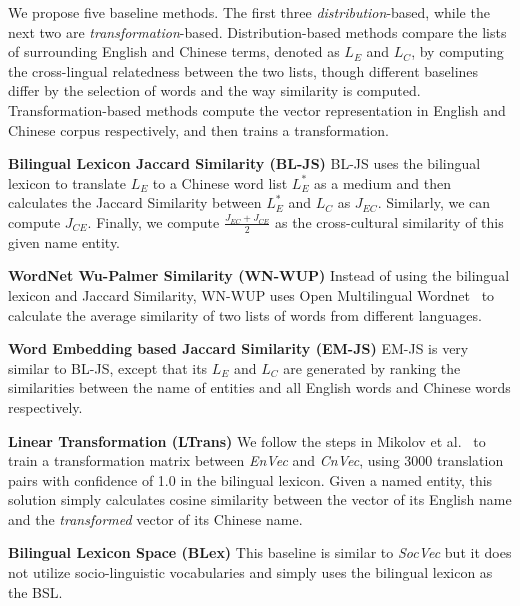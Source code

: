 We propose five baseline methods. The first three
\emph{distribution}-based, while the next two 
are \emph{transformation}-based. 
Distribution-based methods compare the lists of surrounding
English and Chinese terms, denoted as $L_E$ and $L_C$, 
by computing the cross-lingual relatedness between the two lists, 
though different baselines differ by the
selection of words and the way similarity is computed.
Transformation-based methods compute the vector representation 
in English and Chinese corpus respectively, and
then trains a transformation.

\textbf{Bilingual Lexicon Jaccard Similarity (BL-JS)}
BL-JS uses the bilingual lexicon to translate $L_E$  to a Chinese word list 
$L_E^*$ as a medium and then calculates the Jaccard Similarity between 
$L_E^*$ and $L_C$ as $J_{EC}$. Similarly, we can compute $J_{CE}$. 
Finally, we compute $\frac{J_{EC}+J_{CE}}{2}$ as the cross-cultural similarity 
of this given name entity.
 
	\textbf {WordNet Wu-Palmer Similarity (WN-WUP)} Instead of using 
the bilingual lexicon and Jaccard Similarity, WN-WUP uses Open Multilingual 
Wordnet~\cite{wang2013building,bond2013linking} to calculate the average 
similarity of two lists of words from different languages.
	
	\textbf {Word Embedding based Jaccard Similarity (EM-JS)} EM-JS is 
very similar to BL-JS, except that its $L_E$ and $L_C$ are generated by 
ranking the similarities between the name of entities and all English words 
and Chinese words respectively. 

	\textbf {Linear Transformation (LTrans)}
	We follow the steps in Mikolov et al.~ 
to train a transformation matrix between \textit{EnVec} and \textit{CnVec}, 
using 3000 translation pairs with confidence of 1.0 in the bilingual lexicon. 
Given a named entity, this solution simply calculates cosine similarity 
between the vector of its English name and the \textit{transformed} vector 
of its Chinese name. 
	
	\textbf {Bilingual Lexicon Space (BLex)}
	This baseline is similar to \textit{SocVec} but it does not 
utilize socio-linguistic vocabularies and simply uses the bilingual lexicon
as the BSL.

